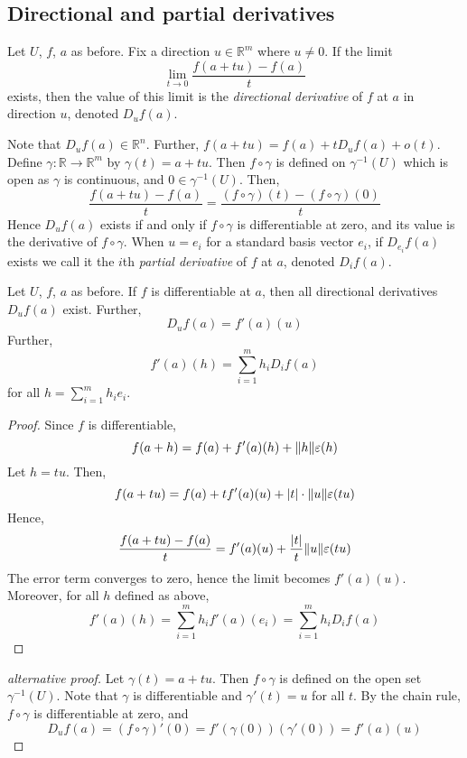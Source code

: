 \subsection{Directional and partial derivatives}
\begin{definition}
	Let \( U \), \( f \), \( a \) as before.
	Fix a direction \( u \in \mathbb R^m \) where \( u \neq 0 \).
	If the limit
	\[
		\lim_{t \to 0} \frac{f(a+tu) - f(a)}{t}
	\]
	exists, then the value of this limit is the \textit{directional derivative} of \( f \) at \( a \) in direction \( u \), denoted \( D_u f(a) \).
\end{definition}
\begin{remark}
	Note that \( D_u f(a) \in \mathbb R^n \).
	Further, \( f(a+tu) = f(a) + t D_u f(a) + o(t) \).
	Define \( \gamma \colon \mathbb R \to \mathbb R^m \) by \( \gamma(t) = a + tu \).
	Then \( f \circ \gamma \) is defined on \( \gamma^{-1}(U) \) which is open as \( \gamma \) is continuous, and \( 0 \in \gamma^{-1}(U) \).
	Then,
	\[
		\frac{f(a+tu) - f(a)}{t} = \frac{(f \circ \gamma)(t) - (f \circ \gamma)(0)}{t}
	\]
	Hence \( D_u f(a) \) exists if and only if \( f \circ \gamma \) is differentiable at zero, and its value is the derivative of \( f \circ \gamma \).
	When \( u = e_i \) for a standard basis vector \( e_i \), if \( D_{e_i} f(a) \) exists we call it the \( i \)th \textit{partial derivative} of \( f \) at \( a \), denoted \( D_i f(a) \).
\end{remark}
\begin{proposition}
	Let \( U \), \( f \), \( a \) as before.
	If \( f \) is differentiable at \( a \), then all directional derivatives \( D_u f(a) \) exist.
	Further,
	\[
		D_u f(a) = f'(a)(u)
	\]
	Further,
	\[
		f'(a)(h) = \sum_{i=1}^m h_i D_i f(a)
	\]
	for all \( h = \sum_{i=1}^m h_i e_i \).
\end{proposition}
\begin{proof}
	Since \( f \) is differentiable,
	\[
		f(a+h) = f(a) + f'(a)(h) + \norm{h} \varepsilon(h)
	\]
	Let \( h = tu \).
	Then,
	\[
		f(a+tu) = f(a) + tf'(a)(u) + \abs{t} \cdot \norm{u} \varepsilon(tu)
	\]
	Hence,
	\[
		\frac{f(a+tu) - f(a)}{t} = f'(a)(u) + \frac{\abs{t}}{t} \norm{u} \varepsilon(tu)
	\]
	The error term converges to zero, hence the limit becomes \( f'(a)(u) \).
	Moreover, for all \( h \) defined as above,
	\[
		f'(a)(h) = \sum_{i=1}^m h_i f'(a)(e_i) = \sum_{i=1}^m h_i D_i f(a)
	\]
\end{proof}
\begin{proof}[alternative proof]
	Let \( \gamma(t) = a+tu \).
	Then \( f \circ \gamma \) is defined on the open set \( \gamma^{-1}(U) \).
	Note that \( \gamma \) is differentiable and \( \gamma'(t) = u \) for all \( t \).
	By the chain rule, \( f \circ \gamma \) is differentiable at zero, and
	\[
		D_u f(a) = (f \circ \gamma)'(0) = f'(\gamma(0))(\gamma'(0)) = f'(a)(u)
	\]
\end{proof}
